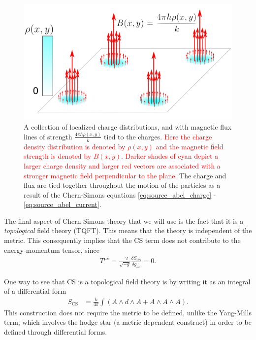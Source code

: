 \begin{figure}[htb]
	\centering
		\includegraphics[scale=0.17]{Background_Folder/figures/flux_attachment_improved.pdf}
    \caption[\textcolor{red}{This figure depicts magnetic flux attachment.}]{A collection of localized charge distributions, and with magnetic flux lines of strength $\frac{4 \pi \hbar \rho(x,y)}{k}$ tied to the charges. \textcolor{red}{Here the charge density distribution is denoted by $\rho(x,y)$ and the magnetic field strength is denoted by $B(x,y)$. Darker shades of cyan depict a larger charge density and larger red vectors are associated with a stronger magnetic field perpendicular to the plane.}  The charge and flux are tied together throughout the motion of the particles as a result of the Chern-Simons equations \eqref{eq:source_abel_charge} - \eqref{eq:source_abel_current}.} \label{fig:flux_attachment}
\end{figure}

The final aspect of Chern-Simons theory that we will use is the fact that it is a \textit{topological} field theory (TQFT). This means that the theory is independent of the metric. This consequently implies that the CS term does not contribute to the energy-momentum tensor, since
\begin{align}
    T^{\mu \nu} = \frac{-2}{ \sqrt{-g}} \frac{\delta S_{\text{CS}}}{ \delta g_{\mu\nu}} =0.
\end{align}

One way to see that CS is a topological field theory is by writing it as an integral of a differential form\colorbox{red}{ }
\begin{align}
    S_{\text{CS}} &= \frac{k}{4 \pi} \int \left(A \wedge d \wedge A +A \wedge A \wedge A\right).
\end{align}
This construction does not require the metric to be defined, unlike the Yang-Mills term, which involves the hodge star (a metric dependent construct) in order to be defined through differential forms.

